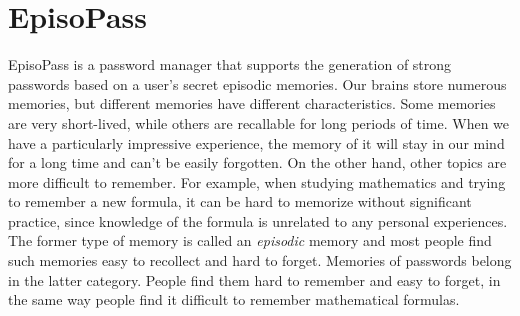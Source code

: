 \documentclass[runningheads,a4paper]{llncs}
\begin{document}
\section{EpisoPass}

EpisoPass is a password manager that supports the generation of
strong passwords based on a user's secret episodic memories.
%
%
Our brains store numerous memories, but different memories have different characteristics.
Some memories are very short-lived, while others are recallable for long periods of time.
When we have a particularly impressive experience,
the memory of it will stay in our mind for a long time and can't be easily forgotten.
On the other hand, other topics are more difficult to remember. For example, when studying mathematics and trying to remember a new formula,
it can be hard to memorize without significant practice,
since knowledge of the formula is unrelated to
any personal experiences.
The former type of memory is called an {\it episodic\/} memory and most people find such
memories easy to recollect and hard to forget.
Memories of passwords belong in the latter category. People find them
hard to remember and easy to forget, in the same way people find it difficult
to remember mathematical formulas.

% 
\end{document}
